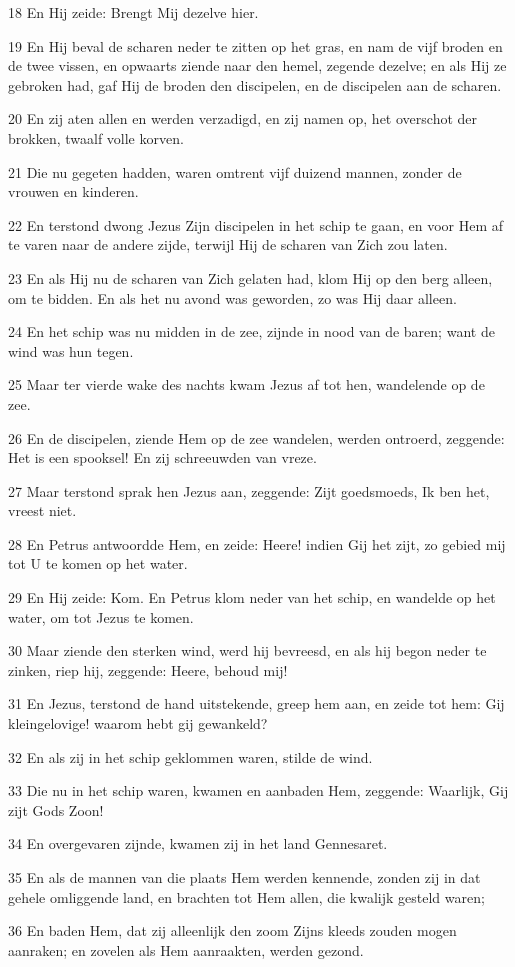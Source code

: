 \par 18 En Hij zeide: Brengt Mij dezelve hier.
\par 19 En Hij beval de scharen neder te zitten op het gras, en nam de vijf broden en de twee vissen, en opwaarts ziende naar den hemel, zegende dezelve; en als Hij ze gebroken had, gaf Hij de broden den discipelen, en de discipelen aan de scharen.
\par 20 En zij aten allen en werden verzadigd, en zij namen op, het overschot der brokken, twaalf volle korven.
\par 21 Die nu gegeten hadden, waren omtrent vijf duizend mannen, zonder de vrouwen en kinderen.
\par 22 En terstond dwong Jezus Zijn discipelen in het schip te gaan, en voor Hem af te varen naar de andere zijde, terwijl Hij de scharen van Zich zou laten.
\par 23 En als Hij nu de scharen van Zich gelaten had, klom Hij op den berg alleen, om te bidden. En als het nu avond was geworden, zo was Hij daar alleen.
\par 24 En het schip was nu midden in de zee, zijnde in nood van de baren; want de wind was hun tegen.
\par 25 Maar ter vierde wake des nachts kwam Jezus af tot hen, wandelende op de zee.
\par 26 En de discipelen, ziende Hem op de zee wandelen, werden ontroerd, zeggende: Het is een spooksel! En zij schreeuwden van vreze.
\par 27 Maar terstond sprak hen Jezus aan, zeggende: Zijt goedsmoeds, Ik ben het, vreest niet.
\par 28 En Petrus antwoordde Hem, en zeide: Heere! indien Gij het zijt, zo gebied mij tot U te komen op het water.
\par 29 En Hij zeide: Kom. En Petrus klom neder van het schip, en wandelde op het water, om tot Jezus te komen.
\par 30 Maar ziende den sterken wind, werd hij bevreesd, en als hij begon neder te zinken, riep hij, zeggende: Heere, behoud mij!
\par 31 En Jezus, terstond de hand uitstekende, greep hem aan, en zeide tot hem: Gij kleingelovige! waarom hebt gij gewankeld?
\par 32 En als zij in het schip geklommen waren, stilde de wind.
\par 33 Die nu in het schip waren, kwamen en aanbaden Hem, zeggende: Waarlijk, Gij zijt Gods Zoon!
\par 34 En overgevaren zijnde, kwamen zij in het land Gennesaret.
\par 35 En als de mannen van die plaats Hem werden kennende, zonden zij in dat gehele omliggende land, en brachten tot Hem allen, die kwalijk gesteld waren;
\par 36 En baden Hem, dat zij alleenlijk den zoom Zijns kleeds zouden mogen aanraken; en zovelen als Hem aanraakten, werden gezond.

